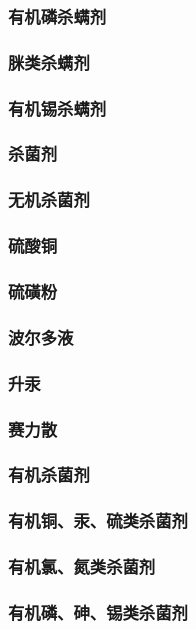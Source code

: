 \documentclass[UTF8]{../../ApplicationUniverse}
\begin{document}
        \subsubsection{有机磷杀螨剂}
        \subsubsection{脒类杀螨剂}
        \subsubsection{有机锡杀螨剂}
\subsubsection{杀菌剂}
    \subsubsection{无机杀菌剂}
        \subsubsection{硫酸铜}
        \subsubsection{硫磺粉}
        \subsubsection{波尔多液}
        \subsubsection{升汞}
        \subsubsection{赛力散}
    \subsubsection{有机杀菌剂}
        \subsubsection{有机铜、汞、硫类杀菌剂}
        \subsubsection{有机氯、氮类杀菌剂}
        \subsubsection{有机磷、砷、锡类杀菌剂}
\end{document}
